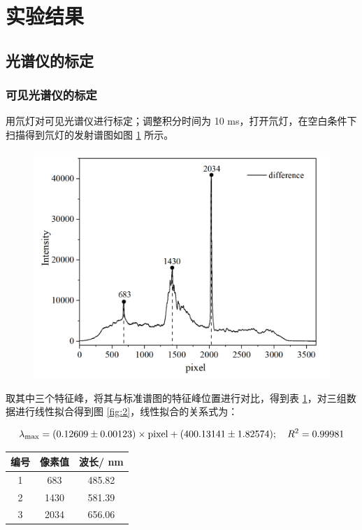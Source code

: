 \section{实验结果}

\subsection{光谱仪的标定}

\subsubsection{可见光谱仪的标定}

用氘灯对可见光谱仪进行标定；调整积分时间为 10 \si{ms}，打开氘灯，在空白条件下扫描得到氘灯的发射谱图如图 \ref{fig:1} 所示。

\begin{figure}[H]
    \centering
    \includegraphics[width=.6\textwidth]{figures2/1-1.png}
    \label{fig:1}
\end{figure}

取其中三个特征峰，将其与标准谱图的特征峰位置进行对比，得到表 \ref{tab:1}，对三组数据进行线性拟合得到图 \ref{fig:2}，线性拟合的关系式为：

\begin{equation}\label{eq:1}
    \lambda_{\rm max} = (0.12609 \pm 0.00123)\times\mathrm{pixel}+(400.13141 \pm 1.82574);\quad R^2=0.99981
\end{equation}

\begin{table}[H]
    \centering
    \begin{tabular}{ccc}
    \toprule
    编号 & 像素值 & 波长/ \si{nm}\\
    \midrule
    1 & 683 & 485.82 \\
    2 & 1430 & 581.39 \\
    3 & 2034 & 656.06 \\
    \bottomrule
    \end{tabular}
    \label{tab:1}
\end{table}

